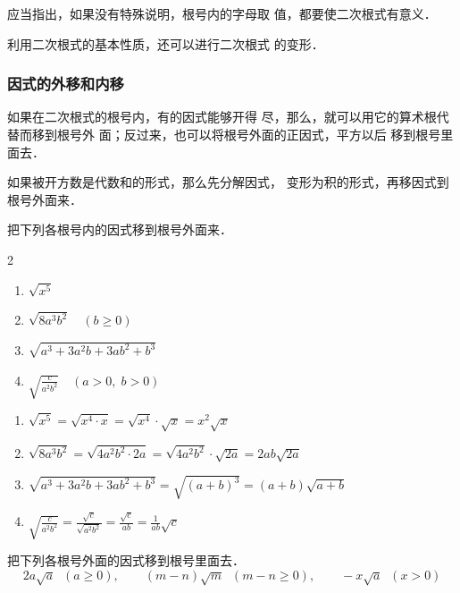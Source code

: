应当指出，如果没有特殊说明，根号内的字母取
值，都要使二次根式有意义．

利用二次根式的基本性质，还可以进行二次根式
的变形．

\subsubsection{因式的外移和内移}
如果在二次根式的根号内，有的因式能够开得
尽，那么，就可以用它的算术根代替而移到根号外
面；反过来，也可以将根号外面的正因式，平方以后
移到根号里面去．

如果被开方数是代数和的形式，那么先分解因式，
变形为积的形式，再移因式到根号外面来．

\begin{example}
    把下列各根号内的因式移到根号外面来．
    \begin{multicols}{2}
     \begin{enumerate}
    \item $\sqrt{x^{5}}$
    \item $\sqrt{8 a^{3} b^{2}}\quad (b \ge 0)$
    \item $\sqrt{a^{3}+3 a^{2} b+3 a b^{2}+b^{3}}$
    \item $\sqrt{\frac{c}{a^{2} b^{2}}}\quad (a>0,\; b>0)$
\end{enumerate}   
    \end{multicols}

\end{example}


\begin{solution}
\begin{enumerate}
    \item $\sqrt{x^{5}}=\sqrt{x^{4} \cdot x}=\sqrt{x^{4}} \cdot \sqrt{x}=x^{2} \sqrt{x}$
    \item $\sqrt{8 a^{3} b^{2}}=\sqrt{4 a^{2} b^{2} \cdot 2 a}=\sqrt{4 a^{2} b^{2}} \cdot \sqrt{2 a}=2 {a} b \sqrt{2 a}$
    \item $\sqrt{a^{3}+3 a^{2} b+3 ab^{2}+b^{3}}=\sqrt{(a+b)^{3}}=(a+b) \sqrt{a+b}$
    \item $\sqrt{\frac{c}{a^{2} b^{2}}}=\frac{\sqrt{c}}{\sqrt{a^{2} b^{2}}}=\frac{\sqrt{c}}{a b}=\frac{1}{a b} \sqrt{c}$
\end{enumerate}
\end{solution}

\begin{example}
    把下列各根号外面的因式移到根号里面去．
\[2a\sqrt{a}\;\;(a\ge 0),\qquad (m-n)\sqrt{m}\;\; (m-n\ge 0),\qquad -x\sqrt{a}\;\;(x>0) \]
\end{example}

